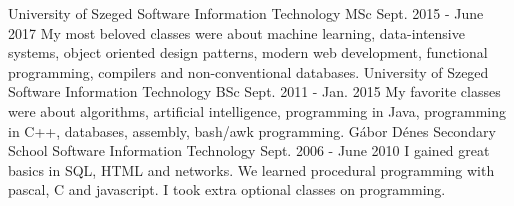 
\educationentry
    {University of Szeged}
    {Software Information Technology MSc}
    {Sept. 2015 - June 2017}
    {%
    My most beloved classes were about machine learning, data-intensive systems, object oriented design patterns, modern web development, functional programming, compilers and non-conventional databases.
    }
\educationentry
    {University of Szeged}
    {Software Information Technology BSc}
    {Sept. 2011 - Jan. 2015}
    {%
    My favorite classes were about algorithms, artificial intelligence, programming in Java, programming in C++, databases, assembly, bash/awk programming.
    }
\educationentry
    {Gábor Dénes Secondary School}
    {Software Information Technology}
    {Sept. 2006 - June 2010}
    {%
    I gained great basics in SQL, HTML and networks. We learned procedural programming with pascal, C and javascript. I took extra optional classes on programming.
    }

    